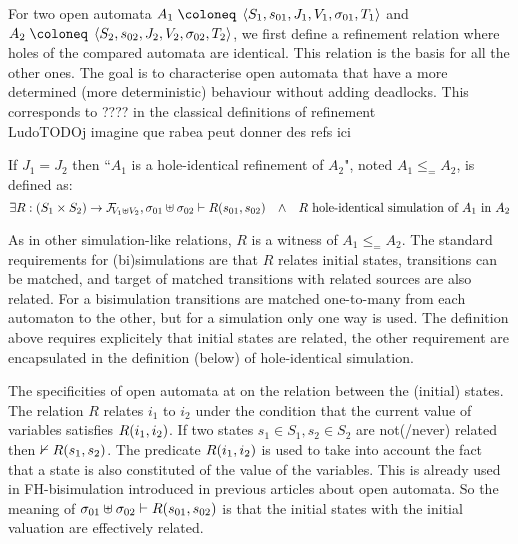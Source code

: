 \documentclass{article}
\begin{document}
For two open automata \(A_1 \defobject \OA{S_1}{s_{01}}{J_1}{V_1}{\sigma_{01}}{T_1}\) and \(A_2 \defobject \OA{S_2}{s_{02}}{J_2}{V_2}{\sigma_{02}}{T_2}\), we first define a refinement relation where holes of the compared automata are identical.
This relation is the basis for all the other ones.
The goal is to characterise open automata that have a more determined (more deterministic) behaviour without adding deadlocks. This corresponds to ???? in the classical definitions of refinement \\Ludo{TODO}{j imagine que rabea peut donner des refs ici}
\begin{defi} %
If \(J_1 = J_2\) then ``\(A_1\) is a hole-identical refinement of \(A_2\)", noted \(A_1 \leq_= A_2\), is defined as:
\[ \exists R: \mpar{S_1 \times S_2} \to \rformulae[V_1 \uplus V_2], \sigma_{01} \uplus \sigma_{02} \vdash R\mpar{s_{01}, s_{02}} \qwedge R \text{ hole-identical simulation of } A_1 \text{ in } A_2 \]
\end{defi}
As in other simulation-like relations, \(R\) is a witness of \(A_1 \leq_= A_2\).
The standard requirements for (bi)simulations are that \(R\) relates initial states, transitions can be matched, and target of matched transitions with related sources are also related.
For a bisimulation transitions are matched one-to-many from each automaton to the other, but for a simulation only one way is used.
The definition above requires explicitely that initial states are related, the other requirement are encapsulated in the definition (below) of hole-identical simulation.

The specificities of open automata at on the relation between the (initial) states.
The relation \(R\) relates \(i_1\) to \(i_2\) under the condition that the current value of variables satisfies \(R{\left(i_1, i_2\right)}\).
If two states \(s_1 \in S_1, s_2 \in S_2\) are not(/never) related then \(\nvdash R{\left(s_1, s_2\right)}\).
The predicate \(R{\left(i_1, i_2\right)}\) is used to take into account the fact that a state is also constituted of the value of the variables.
This is already used in FH-bisimulation introduced in previous articles about open automata.
So the meaning of \(\sigma_{01} \uplus \sigma_{02} \vdash R{\left(s_{01}, s_{02}\right)}\) is that the initial states with the initial valuation are effectively related.
\newpage %
\end{document}
